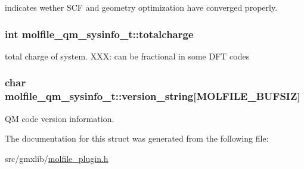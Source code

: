 indicates wether \-S\-C\-F and geometry optimization have converged properly. \hypertarget{structmolfile__qm__sysinfo__t_a066fb9a625e44a055098a0ce68788f48}{
\subsubsection[{totalcharge}]{\setlength{\rightskip}{0pt plus 5cm}int {\bf molfile\-\_\-qm\-\_\-sysinfo\-\_\-t\-::totalcharge}}}\label{structmolfile__qm__sysinfo__t_a066fb9a625e44a055098a0ce68788f48}
total charge of system. \-X\-X\-X\-: can be fractional in some \-D\-F\-T codes \hypertarget{structmolfile__qm__sysinfo__t_a3944fa2befabe29da4c5fadc3b0bb733}{
\subsubsection[{version\-\_\-string}]{\setlength{\rightskip}{0pt plus 5cm}char {\bf molfile\-\_\-qm\-\_\-sysinfo\-\_\-t\-::version\-\_\-string}\mbox{[}{\bf \-M\-O\-L\-F\-I\-L\-E\-\_\-\-B\-U\-F\-S\-I\-Z}\mbox{]}}}\label{structmolfile__qm__sysinfo__t_a3944fa2befabe29da4c5fadc3b0bb733}
\-Q\-M code version information. 

\-The documentation for this struct was generated from the following file\-:\begin{DoxyCompactItemize}
\item 
src/gmxlib/\hyperlink{molfile__plugin_8h}{molfile\-\_\-plugin.\-h}\end{DoxyCompactItemize}
